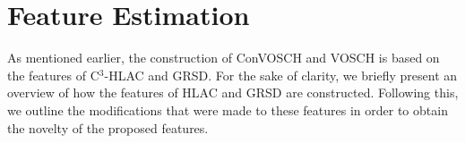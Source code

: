 \documentclass[a4paper, 10 pt, conference]{sty/ieeeconf}
\begin{document}
\section{Feature Estimation}
\label{sec:features}
As mentioned earlier, the construction of ConVOSCH and VOSCH is based on the features of 
C$^3$-HLAC and GRSD. For the sake of clarity,
we briefly present an overview of how the features of HLAC and GRSD are constructed. Following this, we outline the modifications that were made to these features in order to obtain the novelty of the proposed features.
\end{document}

